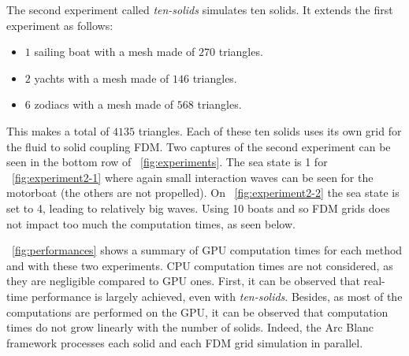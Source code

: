 \documentclass[final]{jcgt}
\def\framework{the Arc Blanc framework\xspace}
\begin{document}
The second experiment called \emph{ten-solids} simulates ten solids.
It extends the first experiment as follows:
\begin{itemize}
	\item $1$ sailing boat with a mesh made of $270$ triangles.
	\item $2$ yachts with a mesh made of $146$ triangles.
	\item $6$ zodiacs with a mesh made of $568$ triangles.
\end{itemize} 
This makes a total of $4135$ triangles. 
Each of these ten solids uses its own grid for the fluid to solid coupling FDM. 
Two captures of the second experiment can be seen in the bottom row of \figurename~\ref{fig:experiments}.
The sea state is 1 for \figurename~\ref{fig:experiment2-1} where again small interaction waves can be seen for the motorboat (the others are not propelled). 
On \figurename~\ref{fig:experiment2-2} the sea state is set to 4, leading to relatively big waves.
Using 10 boats and so FDM grids does not impact too much the computation times, as seen below.

\tablename~\ref{fig:performances} shows a summary of GPU computation times for each method and with these two experiments. 
CPU computation times are not considered, as they are negligible compared to GPU ones. 
First, it can be observed that real-time performance is largely achieved, even with \emph{ten-solids}. 
Besides, as most of the computations are performed on the GPU, it can be observed that computation times do not grow linearly with the number of solids. 
Indeed, \framework processes each solid and each FDM grid simulation in parallel.
\end{document}
